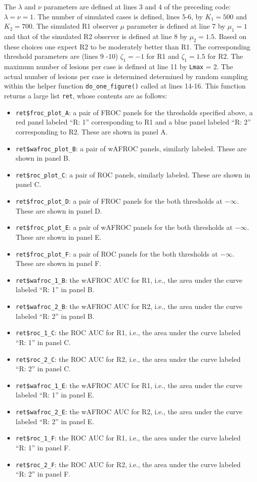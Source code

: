 \documentclass[
]{book}
\providecommand{\tightlist}{%
  \setlength{\itemsep}{0pt}\setlength{\parskip}{0pt}}
\begin{document}
The \(\lambda\) and \(\nu\) parameters are defined at lines 3 and 4 of the preceding code: \(\lambda = \nu = 1\). The number of simulated cases is defined, lines 5-6, by \(K_1 = 500\) and \(K_2 = 700\). The simulated R1 observer \(\mu\) parameter is defined at line 7 by \(\mu_{1} = 1\) and that of the simulated R2 observer is defined at line 8 by \(\mu_{2} = 1.5\). Based on these choices one expect R2 to be moderately better than R1. The corresponding threshold parameters are (lines 9 -10) \(\zeta_{1} = -1\) for R1 and \(\zeta_{1} = 1.5\) for R2. The maximum number of lesions per case is defined at line 11 by \texttt{Lmax} = 2. The actual number of lesions per case is determined determined by random sampling within the helper function \texttt{do\_one\_figure()} called at lines 14-16. This function returns a large list \texttt{ret}, whose contents are as follows:

\begin{itemize}
\tightlist
\item
  \texttt{ret\$froc\_plot\_A}: a pair of FROC panels for the thresholds specified above, a red panel labeled ``R: 1'' corresponding to R1 and a blue panel labeled ``R: 2'' corresponding to R2. These are shown in panel A.
\item
  \texttt{ret\$wafroc\_plot\_B}: a pair of wAFROC panels, similarly labeled. These are shown in panel B.
\item
  \texttt{ret\$roc\_plot\_C}: a pair of ROC panels, similarly labeled. These are shown in panel C.
\item
  \texttt{ret\$froc\_plot\_D}: a pair of FROC panels for the both thresholds at \(-\infty\). These are shown in panel D.
\item
  \texttt{ret\$froc\_plot\_E}: a pair of wAFROC panels for the both thresholds at \(-\infty\). These are shown in panel E.
\item
  \texttt{ret\$froc\_plot\_F}: a pair of ROC panels for the both thresholds at \(-\infty\). These are shown in panel F.
\item
  \texttt{ret\$wafroc\_1\_B}: the wAFROC AUC for R1, i.e., the area under the curve labeled ``R: 1'' in panel B.
\item
  \texttt{ret\$wafroc\_2\_B}: the wAFROC AUC for R2, i.e., the area under the curve labeled ``R: 2'' in panel B.
\item
  \texttt{ret\$roc\_1\_C}: the ROC AUC for R1, i.e., the area under the curve labeled ``R: 1'' in panel C.
\item
  \texttt{ret\$roc\_2\_C}: the ROC AUC for R2, i.e., the area under the curve labeled ``R: 2'' in panel C.
\item
  \texttt{ret\$wafroc\_1\_E}: the wAFROC AUC for R1, i.e., the area under the curve labeled ``R: 1'' in panel E.
\item
  \texttt{ret\$wafroc\_2\_E}: the wAFROC AUC for R2, i.e., the area under the curve labeled ``R: 2'' in panel E.
\item
  \texttt{ret\$roc\_1\_F}: the ROC AUC for R1, i.e., the area under the curve labeled ``R: 1'' in panel F.
\item
  \texttt{ret\$roc\_2\_F}: the ROC AUC for R2, i.e., the area under the curve labeled ``R: 2'' in panel F.
\end{itemize}
\end{document}
